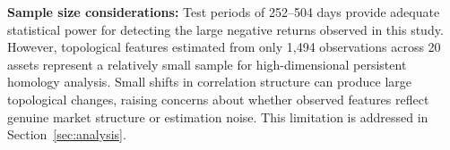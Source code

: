 \textbf{Sample size considerations:} Test periods of 252--504 days provide adequate statistical power for detecting the large negative returns observed in this study. However, topological features estimated from only 1,494 observations across 20 assets represent a relatively small sample for high-dimensional persistent homology analysis. Small shifts in correlation structure can produce large topological changes, raising concerns about whether observed features reflect genuine market structure or estimation noise. This limitation is addressed in Section~\ref{sec:analysis}.
